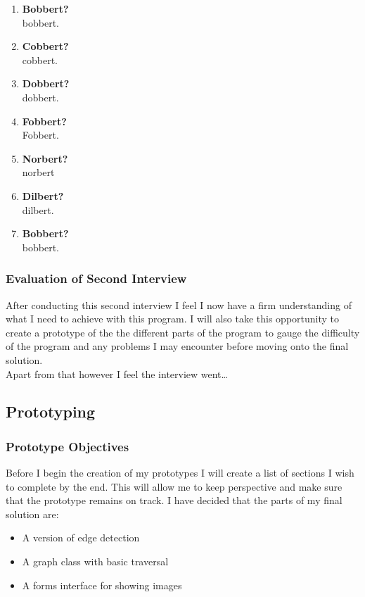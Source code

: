 \begin{flushleft}
            \begin{enumerate}
                \item {\bf{Bobbert?}} \\
                \bk
                bobbert.
                \item {\bf{Cobbert?}} \\
                \bk
                cobbert.
                \item {\bf{Dobbert?}} \\
                \bk
                dobbert.
                \item {\bf{Fobbert?}} \\
                \bk
                Fobbert.
                \item {\bf{Norbert?}} \\
                \bk
                norbert
                \item {\bf{Dilbert?}} \\
                \bk
                dilbert.
                \item {\bf{Bobbert?}} \\
                \bk
                bobbert.
            \end{enumerate}

            \subsubsection{Evaluation of Second Interview}
            After conducting this second interview I feel I now have a firm understanding of what I need to achieve with this program. I will also take this opportunity to create a prototype of the 
            the different parts of the program to gauge the difficulty of the program and any problems I may encounter before moving onto the final solution. \\ \bk
            Apart from that however I feel the interview went\dots %

        \subsection{Prototyping}
        \subsubsection{Prototype Objectives} 
        Before I begin the creation of my prototypes I will create a list of sections I wish to complete by the end. This will allow me to keep perspective and make sure that the prototype remains on track. I have decided that the parts of my final solution are:
        \begin{itemize}
            \item A version of edge detection
            \item A graph class with basic traversal
            \item A forms interface for showing images
        \end{itemize} \\ \bk


\end{flushleft}
